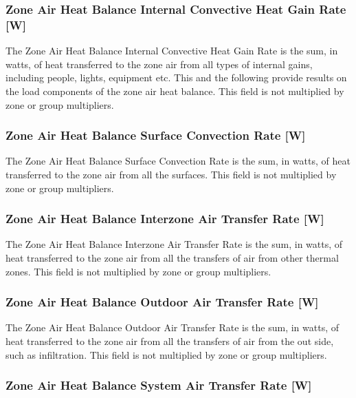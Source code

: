 \subsubsection{Zone Air Heat Balance Internal Convective Heat Gain Rate {[}W{]}}\label{zone-air-heat-balance-internal-convective-heat-gain-rate-w}

The Zone Air Heat Balance Internal Convective Heat Gain Rate is the sum, in watts, of heat transferred to the zone air from all types of internal gains, including people, lights, equipment etc. This and the following provide results on the load components of the zone air heat balance. This field is not multiplied by zone or group multipliers.

\subsubsection{Zone Air Heat Balance Surface Convection Rate {[}W{]}}\label{zone-air-heat-balance-surface-convection-rate-w}

The Zone Air Heat Balance Surface Convection Rate is the sum, in watts, of heat transferred to the zone air from all the surfaces. This field is not multiplied by zone or group multipliers.

\subsubsection{Zone Air Heat Balance Interzone Air Transfer Rate {[}W{]}}\label{zone-air-heat-balance-interzone-air-transfer-rate-w}

The Zone Air Heat Balance Interzone Air Transfer Rate is the sum, in watts, of heat transferred to the zone air from all the transfers of air from other thermal zones. This field is not multiplied by zone or group multipliers.

\subsubsection{Zone Air Heat Balance Outdoor Air Transfer Rate {[}W{]}}\label{zone-air-heat-balance-outdoor-air-transfer-rate-w}

The Zone Air Heat Balance Outdoor Air Transfer Rate is the sum, in watts, of heat transferred to the zone air from all the transfers of air from the out side, such as infiltration. This field is not multiplied by zone or group multipliers.

\subsubsection{Zone Air Heat Balance System Air Transfer Rate {[}W{]}}\label{zone-air-heat-balance-system-air-transfer-rate-w}

